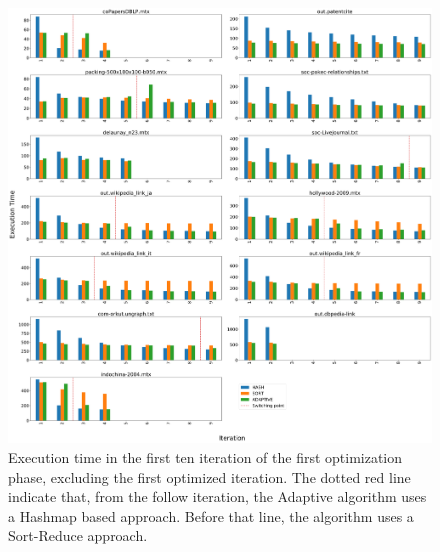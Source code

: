 \begin{figure}[t!]
	\centering
	\hspace*{-3em}
	\includegraphics[width=1.1\linewidth]{0-resources/adaptive-vs-other}
	\caption{Execution time in the first ten iteration of the first optimization phase, excluding the first optimized iteration. The dotted red line indicate that, from the follow iteration, the Adaptive algorithm uses a Hashmap based approach. Before that line, the algorithm uses a Sort-Reduce approach.}
	\label{fig:adaptive-vs-other}
\end{figure}
